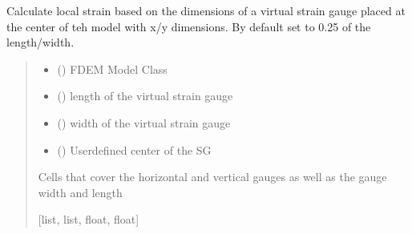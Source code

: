 \documentclass[letterpaper,10pt,english]{sphinxmanual}
\begin{document}
\begin{fulllineitems}
\label{\detokenize{openfdem:openfdem.complete_BD_thread_pool_generators.set_strain_gauge}}
\pysigstartsignatures
{}
\pysigstopsignatures
\sphinxAtStartPar
Calculate local strain based on the dimensions of a virtual strain gauge placed at the center of teh model with
x/y dimensions. By default set to 0.25 of the length/width.
\begin{quote}\begin{description}
\begin{itemize}
\item {} 
\sphinxAtStartPar
{} ({\hyperref[\detokenize{openfdem:openfdem.openfdem.Model}]{}}) \textendash{} FDEM Model Class

\item {} 
\sphinxAtStartPar
{} () \textendash{} length of the virtual strain gauge

\item {} 
\sphinxAtStartPar
{} () \textendash{} width of the virtual strain gauge

\item {} 
\sphinxAtStartPar
{} (\sphinxstyleliteralemphasis{\sphinxupquote{{[}}}\sphinxstyleliteralemphasis{\sphinxupquote{, }}\sphinxstyleliteralemphasis{\sphinxupquote{, }}\sphinxstyleliteralemphasis{\sphinxupquote{{]}}}) \textendash{} User\sphinxhyphen{}defined center of the SG

\end{itemize}

\sphinxAtStartPar
Cells that cover the horizontal and vertical gauges as well as the gauge width and length

\sphinxAtStartPar
{[}list, list, float, float{]}

\end{description}\end{quote}

\end{fulllineitems}
\end{document}
